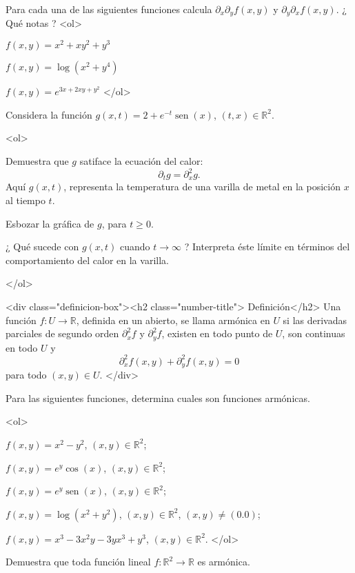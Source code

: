 \documentclass{article}
\theoremstyle{definition}
\newcommand{\sen}{\operatorname{sen}}
\begin{document}
    
    \item Para cada una de las siguientes funciones
    calcula $\partial_{x}\partial_yf(x,y)$ y $\partial_y\partial_xf(x,y)$.
    ¿ Qué notas ?
    <ol>
    \item $f(x,y)=x^2+xy^2+y^3$
    \item $f(x,y)=\log(x^2+y^4)$
    \item $f(x,y)=e^{3x+2xy+y^2}$                 
    </ol>

    
  \item Considera  la función $g(x,t)=2+e^{-t}\sen(x)$,
    $(t,x)\in \mathbb{R}^2$.

    <ol>
    \item Demuestra que $g$ satiface la
      ecuación del calor:
      $$
      \partial_t g= \partial_x^2g.
      $$
      Aquí $g(x,t)$, representa la temperatura de una varilla de metal
      en la posición $x$ al tiempo $t$.
    \item Esbozar la gráfica de $g$, para $t\geq 0$.
    \item ¿ Qué sucede con $g(x,t)$ cuando $t\to \infty$ ?
    Interpreta éste límite en términos del comportamiento del calor
    en la varilla.

  </ol>
  

    <div class="definicion-box"><h2 class="number-title">  Definición</h2>
      Una función $f:U\to \mathbb{R}$, definida en un abierto,
      se llama armónica en $U$ si las
      derivadas parciales de segundo orden $\partial_x^2 f$ y $\partial_y^2 f$,
      existen en todo punto de $U$, son continuas en todo $U$ y
       $$
       \partial_x^2f(x,y)+\partial_y^2f(x,y)=0
       $$ 
       para todo $(x,y)\in U$. 
     </div>

  \item  Para las siguientes funciones,
    determina cuales son funciones armónicas. 

       
    <ol>
    \item $f(x,y)=x^2-y^2$, $(x,y)\in \mathbb{R}^2$;
    \item $f(x,y)=e^y\cos(x)$, $(x,y)\in \mathbb{R}^2$; 
    \item $f(x,y)=e^y\sen(x)$, $(x,y)\in \mathbb{R}^2$;
    \item $f(x,y)=\log(x^2+y^2)$,
      $(x,y)\in \mathbb{R}^2$, $(x,y)\ne (0.0)$;
    \item $f(x,y)=x^3-3x^2y-3yx^3+y^3$, $(x,y)\in \mathbb{R}^2$.
    </ol>		       

  \item Demuestra que toda función
    lineal $f:\mathbb{R}^2\to \mathbb{R}$ es armónica.
    
\end{document}
